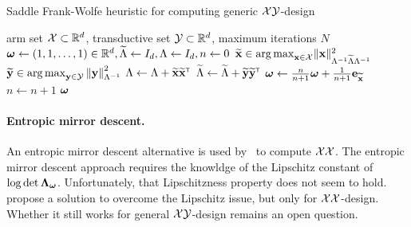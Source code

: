 
\begin{algorithm}[ht]
\centering
\caption{Saddle Frank-Wolfe heuristic for computing generic $\mathcal{X}\mathcal{Y}$-design}
\label{alg:fw_ab}
\begin{algorithmic}
    arm set $\mathcal{X}\subset\mathbb{R}^d$, transductive set $\mathcal{Y}\subset\mathbb{R}^d$, maximum iterations $N$
    ${\boldsymbol \omega} \leftarrow{} (1, 1, \ldots, 1)\in\mathbb{R}^d, \widetilde{\Lambda} \leftarrow{} I_d, \Lambda \leftarrow{} I_d, n \leftarrow{} 0$
        \State $\widetilde{\bf x}\in\operatorname*{arg\,max}_{{\bf x}\in\mathcal{X}} \lVert{\bf x}\rVert_{\Lambda^{-1} \widetilde{\Lambda} \Lambda^{-1} }^2$
        \State $\widetilde{\bf y}\in\operatorname*{arg\,max}_{{\bf y}\in\mathcal{Y}} \left\lVert{\bf y}\right\rVert^2_{\Lambda^{-1}}$
        \State $\Lambda \leftarrow{} \Lambda + \widetilde{\bf x}\widetilde{\bf x}^\mathsf{\scriptscriptstyle T}$
		\State $\widetilde{\Lambda} \leftarrow{} \widetilde{\Lambda} + \widetilde{\bf y}\widetilde{\bf y}^\mathsf{\scriptscriptstyle T}$
        \State ${\boldsymbol \omega} \leftarrow{} \frac{n}{n+1}{\boldsymbol \omega}+\frac{1}{n+1}{\bf e}_{\widetilde{\bf x}}$
        \State $n \leftarrow{} n+1$
   \EndWhile
    ${\boldsymbol \omega}$
\end{algorithmic}
\end{algorithm}

\paragraph{Entropic mirror descent.}
An entropic mirror descent alternative is used by~\citet{tao2018alba} to compute $\mathcal{X}\mathcal{X}$. The entropic mirror descent approach requires the knowldge of the Lipschitz constant of $\log\det {\boldsymbol \Lambda}_{{\boldsymbol \omega}}$. Unfortunately, that Lipschitzness property does not seem to hold. \citet{lu2018convex} propose a solution to overcome the Lipschitz issue, but only for $\mathcal{X}\mathcal{X}$-design. Whether it still works for general $\mathcal{X}\mathcal{Y}$-design remains an open question.


